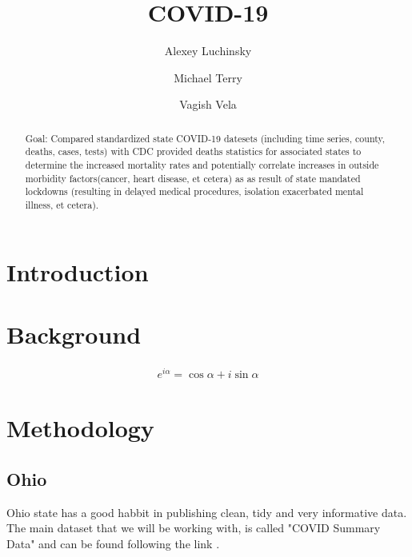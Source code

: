 \documentclass[conference]{IEEEtran}
\begin{document}
\title{COVID-19}
\author{Alexey Luchinsky \and Michael Terry  \and Vagish Vela}
\maketitle

\begin{abstract}
Goal: Compared standardized state COVID-19 datesets (including time series, county, deaths, cases, tests) with CDC provided deaths statistics for associated states to determine the increased mortality rates and potentially correlate increases in outside morbidity factors(cancer, heart disease, et cetera) as as result of state mandated lockdowns (resulting in delayed medical procedures, isolation exacerbated mental illness, et cetera).
  \blindtext
\end{abstract}

\section{Introduction}

\blindtext

\blindtext

\section{Background}

\blindtext 

\begin{eqnarray}
  \label{eq:1}
  e^{i\alpha} = \cos\alpha + i \sin\alpha
\end{eqnarray}

\blindtext 

\blindtext 

\section{Methodology}

\subsection{Ohio}
\label{Ohio}

Ohio state has a good habbit in publishing clean, tidy and very informative data. The main dataset that we will be working with, is called "COVID Summary Data" and can be found following the link \cite{ODRSsummary}.
\end{document}
